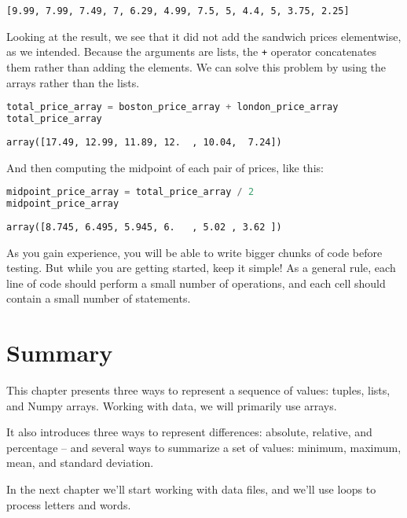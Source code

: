 \begin{lstlisting}[style=output]
[9.99, 7.99, 7.49, 7, 6.29, 4.99, 7.5, 5, 4.4, 5, 3.75, 2.25]
\end{lstlisting}

Looking at the result, we see that it did not add the sandwich prices
elementwise, as we intended. Because the arguments are lists, the
\passthrough{\lstinline!+!} operator concatenates them rather than
adding the elements. We can solve this problem by using the arrays
rather than the lists.

\begin{lstlisting}[language=Python,style=source]
total_price_array = boston_price_array + london_price_array
total_price_array
\end{lstlisting}

\begin{lstlisting}[style=output]
array([17.49, 12.99, 11.89, 12.  , 10.04,  7.24])
\end{lstlisting}

\pagebreak

And then computing the midpoint of each pair of prices, like this:

\begin{lstlisting}[language=Python,style=source]
midpoint_price_array = total_price_array / 2
midpoint_price_array
\end{lstlisting}

\begin{lstlisting}[style=output]
array([8.745, 6.495, 5.945, 6.   , 5.02 , 3.62 ])
\end{lstlisting}

As you gain experience, you will be able to write bigger chunks of code
before testing. But while you are getting started, keep it simple! As a
general rule, each line of code should perform a small number of
operations, and each cell should contain a small number of statements.

\section{Summary}\label{summary}

This chapter presents three ways to represent a sequence of values:
tuples, lists, and Numpy arrays. Working with data, we will primarily
use arrays.

It also introduces three ways to represent differences: absolute,
relative, and percentage -- and several ways to summarize a set of
values: minimum, maximum, mean, and standard deviation.

In the next chapter we'll start working with data files, and we'll use
loops to process letters and words.
